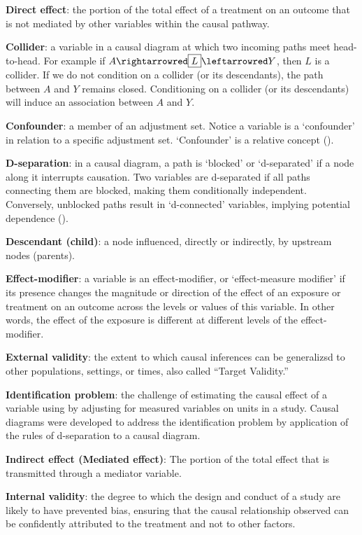 \documentclass[
  singlecolumn]{article}
\begin{document}
\textbf{Direct effect}: the portion of the total effect of a treatment
on an outcome that is not mediated by other variables within the causal
pathway.

\textbf{Collider}: a variable in a causal diagram at which two incoming
paths meet head-to-head. For example if
\(A \rightarrowred \boxed{L} \leftarrowred Y\), then \(L\) is a
collider. If we do not condition on a collider (or its descendants), the
path between \(A\) and \(Y\) remains closed. Conditioning on a collider
(or its descendants) will induce an association between \(A\) and \(Y\).

\textbf{Confounder}: a member of an adjustment set. Notice a variable is
a `confounder' in relation to a specific adjustment set. `Confounder' is
a relative concept ().

\textbf{D-separation}: in a causal diagram, a path is `blocked' or
`d-separated' if a node along it interrupts causation. Two variables are
d-separated if all paths connecting them are blocked, making them
conditionally independent. Conversely, unblocked paths result in
`d-connected' variables, implying potential dependence
().

\textbf{Descendant (child)}: a node influenced, directly or indirectly,
by upstream nodes (parents).

\textbf{Effect-modifier}: a variable is an effect-modifier, or
`effect-measure modifier' if its presence changes the magnitude or
direction of the effect of an exposure or treatment on an outcome across
the levels or values of this variable. In other words, the effect of the
exposure is different at different levels of the effect-modifier.

\textbf{External validity}: the extent to which causal inferences can be
generalizsd to other populations, settings, or times, also called
``Target Validity.''

\textbf{Identification problem}: the challenge of estimating the causal
effect of a variable using by adjusting for measured variables on units
in a study. Causal diagrams were developed to address the identification
problem by application of the rules of d-separation to a causal diagram.

\textbf{Indirect effect (Mediated effect)}: The portion of the total
effect that is transmitted through a mediator variable.

\textbf{Internal validity}: the degree to which the design and conduct
of a study are likely to have prevented bias, ensuring that the causal
relationship observed can be confidently attributed to the treatment and
not to other factors.
\end{document}
